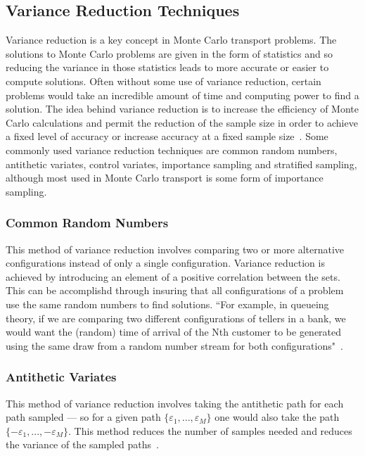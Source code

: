 \subsection{ \textbf{Variance Reduction Techniques} }

Variance reduction is a key concept in Monte Carlo transport problems.
%
The solutions to Monte Carlo problems are given in the form of statistics and so reducing the variance in those statistics leads to more accurate or easier to compute solutions.
%
Often without some use of variance reduction, certain problems would take an incredible amount of time and computing power to find a solution.
%
The idea behind variance reduction is to increase the efficiency of Monte Carlo calculations and permit the reduction of the sample size in order to achieve a fixed level of accuracy or increase accuracy at a fixed sample size~\cite{kahn1953methods}.
%
Some commonly used variance reduction techniques are common random numbers, antithetic variates, control variates, importance sampling and stratified sampling, although most used in Monte Carlo transport is some form of importance sampling.
%

\subsubsection*{\textbf{Common Random Numbers}} This method of variance reduction involves comparing two or more alternative configurations instead of only a single configuration. Variance reduction is achieved by introducing an element of a positive correlation between the sets. This can be accomplishd through insuring that all configurations of a problem use the same random numbers to find solutions. ``For example, in queueing theory, if we are comparing two different configurations of tellers in a bank, we would want the (random) time of arrival of the Nth customer to be generated using the same draw from a random number stream for both configurations"~\cite{wikipediaVarReduction}.

\subsubsection*{\textbf{Antithetic Variates}} This method of variance reduction involves taking the antithetic path for each path sampled --- so for a given path $ \{ \varepsilon_1, ..., \varepsilon_M \}$ one would also take the path $ \{ -\varepsilon_1, ... , -\varepsilon_M  \} $. This method reduces the number of samples needed and reduces the variance of the sampled paths~\cite{wikipediaAntitheticVaraites}.

